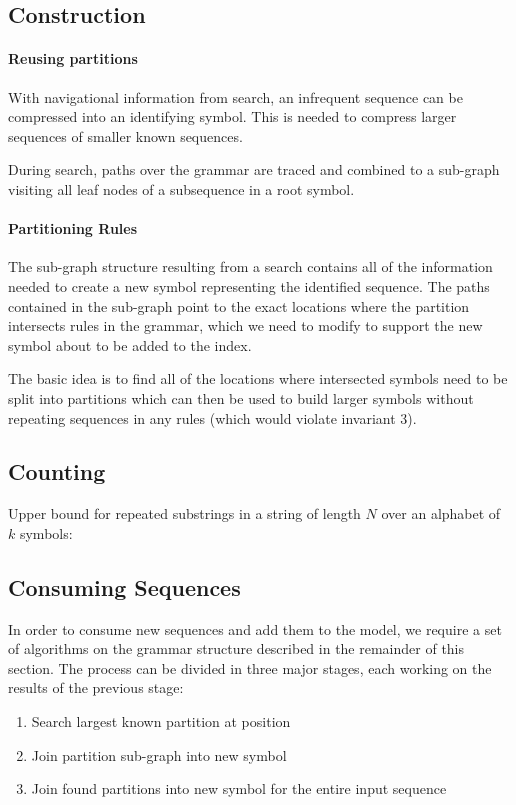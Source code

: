 \subsection{Construction}

\paragraph{Reusing partitions}
With navigational information from search, an infrequent sequence can be compressed into an identifying symbol. This is needed to compress larger sequences of smaller known sequences.

During search, paths over the grammar are traced and combined to a sub-graph visiting all leaf nodes of a subsequence in a root symbol.

\paragraph{Partitioning Rules}
The sub-graph structure resulting from a search contains all of the information needed to create a new symbol representing the identified sequence. The paths contained in the sub-graph point to the exact locations where the partition intersects rules in the grammar, which we need to modify to support the new symbol about to be added to the index.

The basic idea is to find all of the locations where intersected symbols need to be split into partitions which can then be used to build larger symbols without repeating sequences in any rules (which would violate invariant 3).

\subsection{Counting}
Upper bound for repeated substrings in a string of length $N$ over an alphabet of $k$ symbols:


\subsection{Consuming Sequences}
In order to consume new sequences and add them to the model, we require a set of algorithms on the grammar structure described in the remainder of this section. The process can be divided in three major stages, each working on the results of the previous stage:
\begin{enumerate}
\item Search largest known partition at position
\item Join partition sub-graph into new symbol
\item Join found partitions into new symbol for the entire input sequence
\end{enumerate}


